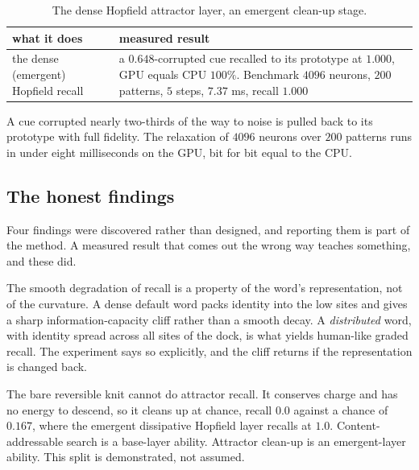 \begin{table}[ht]
\centering
\begin{tabular}{@{}p{}p{}@{}}
\toprule
what it does & measured result \\
\midrule
the dense (emergent) Hopfield recall & a $0.648$-corrupted cue recalled to its prototype at $1.000$, GPU equals CPU $100\%$. Benchmark $4096$ neurons, $200$ patterns, $5$ steps, $7.37$ ms, recall $1.000$ \\
\bottomrule
\end{tabular}
\caption{The dense Hopfield attractor layer, an emergent clean-up stage.}
\label{tab:hopfield}
\end{table}

A cue corrupted nearly two-thirds of the way to noise is pulled back to its prototype with full fidelity. The relaxation of $4096$ neurons over $200$ patterns runs in under eight milliseconds on the GPU, bit for bit equal to the CPU.

\subsection{The honest findings}

Four findings were discovered rather than designed, and reporting them is part of the method. A measured result that comes out the wrong way teaches something, and these did.

\begin{result}
The smooth degradation of recall is a property of the word's representation, not of the curvature. A dense default word packs identity into the low sites and gives a sharp information-capacity cliff rather than a smooth decay. A \emph{distributed} word, with identity spread across all sites of the dock, is what yields human-like graded recall. The experiment says so explicitly, and the cliff returns if the representation is changed back.
\end{result}

\begin{result}
The bare reversible knit cannot do attractor recall. It conserves charge and has no energy to descend, so it cleans up at chance, recall $0.0$ against a chance of $0.167$, where the emergent dissipative Hopfield layer recalls at $1.0$. Content-addressable search is a base-layer ability. Attractor clean-up is an emergent-layer ability. This split is demonstrated, not assumed.
\end{result}

